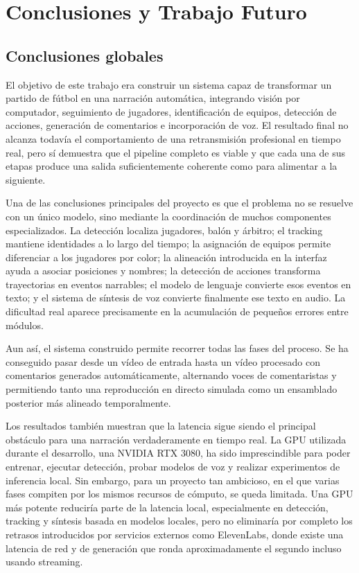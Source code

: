\chapter{Conclusiones y Trabajo Futuro}
\label{cap:conclusiones}

\section{Conclusiones globales}

El objetivo de este trabajo era construir un sistema capaz de transformar un partido de fútbol en una narración automática, integrando visión por computador, seguimiento de jugadores, identificación de equipos, detección de acciones, generación de comentarios e incorporación de voz. El resultado final no alcanza todavía el comportamiento de una retransmisión profesional en tiempo real, pero sí demuestra que el pipeline completo es viable y que cada una de sus etapas produce una salida suficientemente coherente como para alimentar a la siguiente.

Una de las conclusiones principales del proyecto es que el problema no se resuelve con un único modelo, sino mediante la coordinación de muchos componentes especializados. La detección localiza jugadores, balón y árbitro; el tracking mantiene identidades a lo largo del tiempo; la asignación de equipos permite diferenciar a los jugadores por color; la alineación introducida en la interfaz ayuda a asociar posiciones y nombres; la detección de acciones transforma trayectorias en eventos narrables; el modelo de lenguaje convierte esos eventos en texto; y el sistema de síntesis de voz convierte finalmente ese texto en audio. La dificultad real aparece precisamente en la acumulación de pequeños errores entre módulos.

Aun así, el sistema construido permite recorrer todas las fases del proceso. Se ha conseguido pasar desde un vídeo de entrada hasta un vídeo procesado con comentarios generados automáticamente, alternando voces de comentaristas y permitiendo tanto una reproducción en directo simulada como un ensamblado posterior más alineado temporalmente. 

Los resultados también muestran que la latencia sigue siendo el principal obstáculo para una narración verdaderamente en tiempo real. La GPU utilizada durante el desarrollo, una NVIDIA RTX 3080, ha sido imprescindible para poder entrenar, ejecutar detección, probar modelos de voz y realizar experimentos de inferencia local. Sin embargo, para un proyecto tan ambicioso, en el que varias fases compiten por los mismos recursos de cómputo, se queda limitada. Una GPU más potente reduciría parte de la latencia local, especialmente en detección, tracking y síntesis basada en modelos locales, pero no eliminaría por completo los retrasos introducidos por servicios externos como ElevenLabs, donde existe una latencia de red y de generación que ronda aproximadamente el segundo incluso usando streaming.

